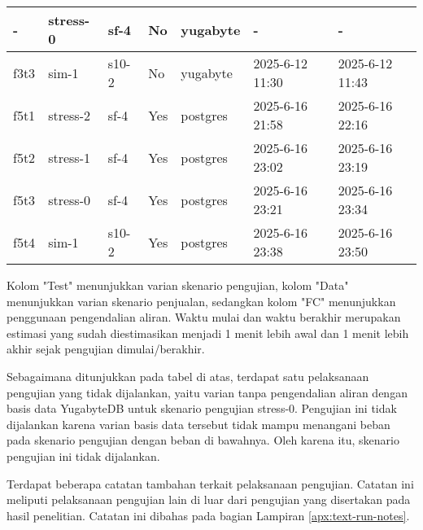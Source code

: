 \begin{table}[htbp]
\begin{tabular}{|l|l|l|l|l|l|l|}
        -           & stress-0      & sf-4          & No          & yugabyte          & -                    & -                       \\ \hline
        f3t3        & sim-1         & s10-2         & No          & yugabyte          & 2025-6-12 11:30      & 2025-6-12 11:43         \\ \hline
        f5t1        & stress-2      & sf-4          & Yes         & postgres          & 2025-6-16 21:58      & 2025-6-16 22:16         \\ \hline
        f5t2        & stress-1      & sf-4          & Yes         & postgres          & 2025-6-16 23:02      & 2025-6-16 23:19         \\ \hline
        f5t3        & stress-0      & sf-4          & Yes         & postgres          & 2025-6-16 23:21      & 2025-6-16 23:34         \\ \hline
        f5t4        & sim-1         & s10-2         & Yes         & postgres          & 2025-6-16 23:38      & 2025-6-16 23:50         \\ \hline
    \end{tabular}
\end{table}

Kolom "Test" menunjukkan varian skenario pengujian, kolom "Data" menunjukkan varian skenario penjualan, sedangkan kolom "FC" menunjukkan penggunaan pengendalian aliran. Waktu mulai dan waktu berakhir merupakan estimasi yang sudah diestimasikan menjadi 1 menit lebih awal dan 1 menit lebih akhir sejak pengujian dimulai/berakhir.

Sebagaimana ditunjukkan pada tabel di atas, terdapat satu pelaksanaan pengujian yang tidak dijalankan, yaitu varian tanpa pengendalian aliran dengan basis data YugabyteDB untuk skenario pengujian stress-0. Pengujian ini tidak dijalankan karena varian basis data tersebut tidak mampu menangani beban pada skenario pengujian dengan beban di bawahnya. Oleh karena itu, skenario pengujian ini tidak dijalankan.

Terdapat beberapa catatan tambahan terkait pelaksanaan pengujian. Catatan ini meliputi pelaksanaan pengujian lain di luar dari pengujian yang disertakan pada hasil penelitian. Catatan ini dibahas pada bagian Lampiran \ref{apx:text-run-notes}.
